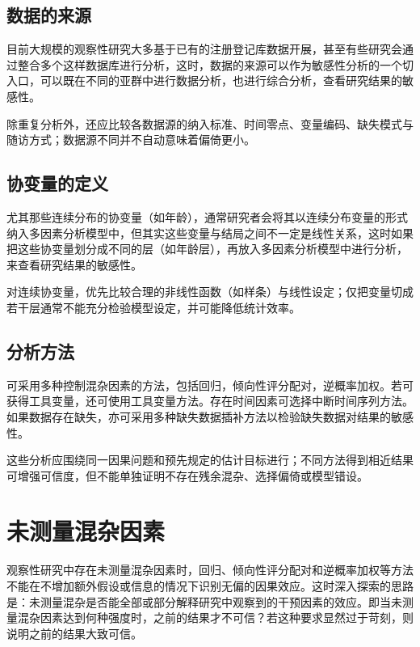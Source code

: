 \documentclass[
  chinese-hans,
  letterpaper,
  DIV=11,
  numbers=noendperiod]{scrreprt}
\begin{document}
\subsection{数据的来源}\label{ux6570ux636eux7684ux6765ux6e90}

目前大规模的观察性研究大多基于已有的注册登记库数据开展，甚至有些研究会通过整合多个这样数据库进行分析，这时，数据的来源可以作为敏感性分析的一个切入口，可以既在不同的亚群中进行数据分析，也进行综合分析，查看研究结果的敏感性。

除重复分析外，还应比较各数据源的纳入标准、时间零点、变量编码、缺失模式与随访方式；数据源不同并不自动意味着偏倚更小。

\subsection{协变量的定义}\label{ux534fux53d8ux91cfux7684ux5b9aux4e49}

尤其那些连续分布的协变量（如年龄），通常研究者会将其以连续分布变量的形式纳入多因素分析模型中，但其实这些变量与结局之间不一定是线性关系，这时如果把这些协变量划分成不同的层（如年龄层），再放入多因素分析模型中进行分析，来查看研究结果的敏感性。

对连续协变量，优先比较合理的非线性函数（如样条）与线性设定；仅把变量切成若干层通常不能充分检验模型设定，并可能降低统计效率。

\subsection{分析方法}\label{ux5206ux6790ux65b9ux6cd5}

可采用多种控制混杂因素的方法，包括回归，倾向性评分配对，逆概率加权。若可获得工具变量，还可使用工具变量方法。存在时间因素可选择中断时间序列方法。如果数据存在缺失，亦可采用多种缺失数据插补方法以检验缺失数据对结果的敏感性。

这些分析应围绕同一因果问题和预先规定的估计目标进行；不同方法得到相近结果可增强可信度，但不能单独证明不存在残余混杂、选择偏倚或模型错设。

\section{未测量混杂因素}\label{ux672aux6d4bux91cfux6df7ux6742ux56e0ux7d20}

观察性研究中存在未测量混杂因素时，回归、倾向性评分配对和逆概率加权等方法不能在不增加额外假设或信息的情况下识别无偏的因果效应。这时深入探索的思路是：未测量混杂是否能全部或部分解释研究中观察到的干预因素的效应。即当未测量混杂因素达到何种强度时，之前的结果才不可信？若这种要求显然过于苛刻，则说明之前的结果大致可信。
\end{document}
